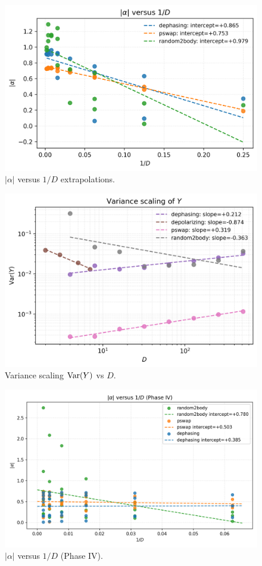 \documentclass[11pt]{article}
\begin{document}
\begin{figure}[h]
\centering
\includegraphics[width=0.7\linewidth]{../figures/phase3_alpha_vs_invD.png}
\caption{$|\alpha|$ versus $1/D$ extrapolations.}
\end{figure}

\begin{figure}[h]
\centering
\includegraphics[width=0.7\linewidth]{../figures/phase3_varY_scaling.png}
\caption{Variance scaling $\mathrm{Var}(Y)$ vs $D$.}
\end{figure}

\begin{figure}[h]
\centering
\includegraphics[width=0.7\linewidth]{../figures/phase4_alpha_vs_invD.png}
\caption{$|\alpha|$ versus $1/D$ (Phase IV).}
\label{fig:phase4-alpha-invD}
\end{figure}
\end{document}
